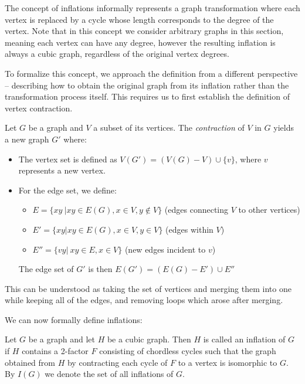 \documentclass[12pt, twoside]{book}
\begin{document}
The concept of inflations informally represents a graph transformation where each vertex is replaced by a cycle whose length corresponds to the degree of the vertex. Note that in this concept we consider arbitrary graphs in this section, meaning each vertex can have any degree, however the resulting inflation is always a cubic graph, regardless of the original vertex degrees.

To formalize this concept, we approach the definition from a different perspective -- describing how to obtain the original graph from its inflation rather than the transformation process itself. This requires us to first establish the definition of vertex contraction.

Let $G$ be a graph and $V$ a subset of its vertices. The \textit{contraction} of $V$ in $G$ yields a new graph $G'$ where:
\begin{itemize}
	\item The vertex set is defined as $V(G') = (V(G)-V)\cup \{v\}$, where $v$ represents a new vertex.
	\item For the edge set, we define:
	\begin{itemize}
		\item $E=\{xy~|xy\in E(G), x\in V, y\notin V\}$ (edges connecting $V$ to other vertices)
		\item $E'=\{xy | xy\in E(G), x\in V, y\in V\}$ (edges within $V$)
		\item $E''=\{vy|~ xy\in E, x\in V\}$ (new edges incident to $v$)
	\end{itemize}
	
	The edge set of $G'$ is then ${E(G')=(E(G)-E')\cup E''}$
\end{itemize}

This can be understood as taking the set of vertices and merging them into one while keeping all of the edges, and removing loops which arose after merging.

We can now formally define inflations:

\begin{definition}
	Let $G$ be a graph and let $H$ be a cubic graph. Then $H$ is called an inflation of $G$ if $H$ contains a 2-factor $F$ consisting of chordless cycles such that the graph obtained from $H$ by contracting each cycle of $F$ to a vertex is isomorphic to $G$. By $I(G)$ we denote the set of all inflations of $G$.
\end{definition}
\end{document}
